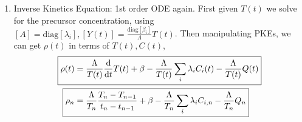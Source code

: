 \documentclass{school-22.211-notes}
\begin{document}
\begin{enumerate}
\item Inverse Kinetics Equation: 1st order ODE again. First given $T(t)$ we solve for the precursor concentration, using $[A] = \mathrm{diag}[\lambda_i], [Y(t)] = \frac{\mathrm{diag}[\beta_i]}{\Lambda} T(t)$. 
Then manipulating PKEs, we can get $\rho(t)$ in terms of $T(t), C(t)$, 
\begin{align}
\Aboxed{\rho(t) &= \frac{\Lambda}{T(t)} \ddt T(t) + \beta - \frac{\Lambda}{T(t)} \Sum_i \lambda_i C_i(t) - \frac{\Lambda}{T(t)} Q(t) } \\
\Aboxed{ \rho_n &= \frac{\Lambda}{T_n} \frac{T_n - T_{n-1}}{t_n - t_{n-1}} + \beta - \frac{\Lambda}{T_n} \Sum_i \lambda_i C_{i,n} - \frac{\Lambda}{T_n} Q_n } 
\end{align}
\end{enumerate}
\end{document}
